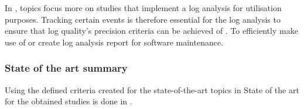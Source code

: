 In , topics focus more on studies that implement a log analysis for utilisation purposes. Tracking certain events is therefore essential for the log analysis to ensure that log quality's precision criteria can be achieved of . To efficiently make use of or create log analysis report for software maintenance.

\subsubsection{State of the art summary}
Using the defined criteria created for the state-of-the-art topics in  State of the art for the obtained studies is done in .

\clearpage

\newcommand{\sotaCore}{\rowcolor{lightgray}
\cite{Ogheneovo2014} & Partial & \cmark & \cmark & \xmark & \xmark & \xmark \\
\cite{Tang2010} & Partial & Partial & \cmark & \xmark & \xmark & \xmark \\
\rowcolor{lightgray}
\cite{Sneed2004} & Partial & \cmark & \cmark & \xmark & \xmark & \xmark \\
\cite{Stojanov2017} & \xmark & \cmark & \cmark & \xmark & \xmark & \xmark \\
\rowcolor{lightgray}
\cite{Galster2019} & \cmark & Partial & \xmark & \xmark & \xmark & \xmark \\
\cite{Lenarduzzi2017} & Partial & \cmark & \cmark & \xmark & \xmark & \xmark \\
\rowcolor{lightgray}
\cite{Araujo2021} & Partial & \xmark & \cmark & \xmark & \xmark & \xmark \\	
\cite{Zhu2019} & \xmark & \xmark & \xmark & \cmark & Partial & \xmark \\
\rowcolor{lightgray}
\cite{Rong2018} & \xmark & \xmark & \xmark & Partial & Partial & \xmark \\
\cite{Zhu2015} & \xmark & \xmark & \xmark & \cmark & \cmark & \xmark \\
\rowcolor{lightgray}
\cite{Kherbouche2017} & \xmark & \xmark & \xmark & Partial & Partial & \xmark \\
\cite{Hasiloglu2018} & \xmark & \xmark & \xmark & \cmark & \cmark & Partial \\
\rowcolor{lightgray}
\cite{Slaninova2014} & \xmark & \xmark & \xmark & \cmark & \cmark & Partial \\
\cite{Waqar2017} & \xmark & \xmark & \xmark & \xmark & \xmark & \cmark \\
\rowcolor{lightgray}
\cite{Kumar2017} & \xmark & \xmark & \xmark & \xmark & \xmark & \cmark \\
}

